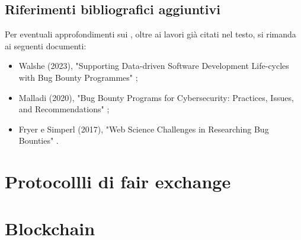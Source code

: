 \subsection{Riferimenti bibliografici aggiuntivi}

Per eventuali approfondimenti sui \BBP, oltre ai lavori già citati nel testo, si rimanda ai seguenti documenti: 
\begin{itemize}

\item Walshe (2023), "Supporting Data-driven Software Development Life-cycles with Bug Bounty Programmes" \cite{walshe2023bountythesis};

\item Malladi \etAl (2020), "Bug Bounty Programs for Cybersecurity: Practices, Issues, and Recommendations" \cite{malladi2020bugbounty};

\item Fryer e Simperl (2017), "Web Science Challenges in Researching Bug Bounties" \cite{fryer2017bugbounty}.

\end{itemize}

\section{Protocollli di fair exchange}

%
%

\section{Blockchain}

%
%


